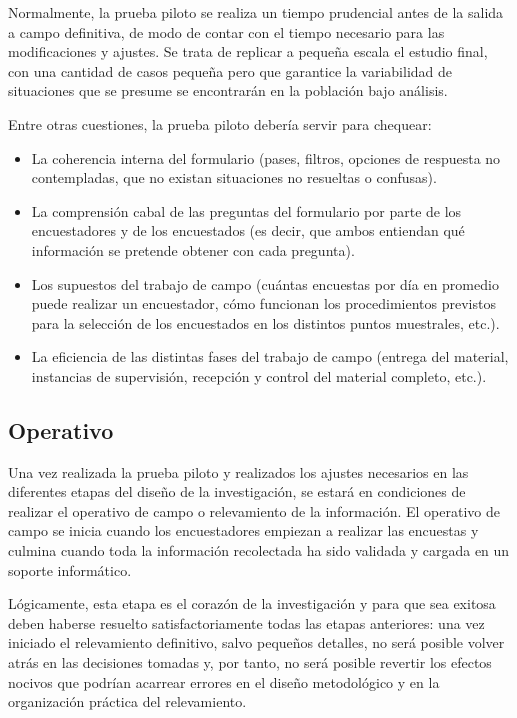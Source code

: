 \documentclass[
]{book}
\begin{document}
Normalmente, la prueba piloto se realiza un tiempo prudencial antes de la salida a campo definitiva, de modo de contar con el tiempo necesario para las modificaciones y ajustes. Se trata de replicar a pequeña escala el estudio final, con una cantidad de casos pequeña pero que garantice la variabilidad de situaciones que se presume se encontrarán en la población bajo análisis.

Entre otras cuestiones, la prueba piloto debería servir para chequear:

\begin{itemize}
\item
  La coherencia interna del formulario (pases, filtros, opciones de respuesta no contempladas, que no existan situaciones no resueltas o confusas).
\item
  La comprensión cabal de las preguntas del formulario por parte de los encuestadores y de los encuestados (es decir, que ambos entiendan qué información se pretende obtener con cada pregunta).
\item
  Los supuestos del trabajo de campo (cuántas encuestas por día en promedio puede realizar un encuestador, cómo funcionan los procedimientos previstos para la selección de los encuestados en los distintos puntos muestrales, etc.).
\item
  La eficiencia de las distintas fases del trabajo de campo (entrega del material, instancias de supervisión, recepción y control del material completo, etc.).
\end{itemize}

\hypertarget{operativo}{%
\subsection{Operativo}\label{operativo}}

Una vez realizada la prueba piloto y realizados los ajustes necesarios en las diferentes etapas del diseño de la investigación, se estará en condiciones de realizar el operativo de campo o relevamiento de la información. El operativo de campo se inicia cuando los encuestadores empiezan a realizar las encuestas y culmina cuando toda la información recolectada ha sido validada y cargada en un soporte informático.

Lógicamente, esta etapa es el corazón de la investigación y para que sea exitosa deben haberse resuelto satisfactoriamente todas las etapas anteriores: una vez iniciado el relevamiento definitivo, salvo pequeños detalles, no será posible volver atrás en las decisiones tomadas y, por tanto, no será posible revertir los efectos nocivos que podrían acarrear errores en el diseño metodológico y en la organización práctica del relevamiento.
\end{document}
